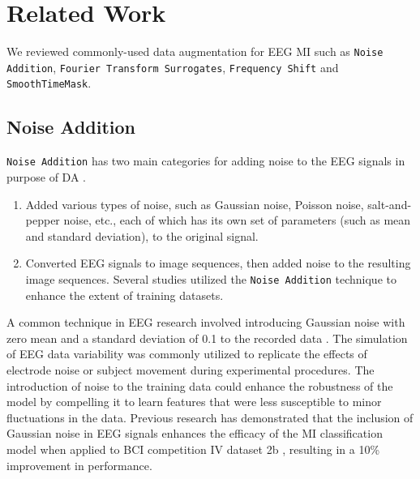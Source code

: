 \documentclass[runningheads]{llncs}
\begin{document}
\section{Related Work}

\begin{sloppypar}    
We reviewed commonly-used data augmentation for EEG MI such as \texttt{Noise Addition}, \texttt{Fourier Transform Surrogates}, \texttt{Frequency Shift} and \texttt{SmoothTimeMask}.
\end{sloppypar}

\subsection{Noise Addition}
\texttt{Noise Addition} has two main categories for adding noise to the EEG signals in purpose of DA \cite{lashgari2020data}.
\begin{enumerate}
  \item Added various types of noise, such as Gaussian noise, Poisson noise, salt-and-pepper noise, etc., each of which has its own set of parameters (such as mean and standard deviation), to the original signal.
  \item Converted EEG signals to image sequences, then added noise to the resulting image sequences. Several studies utilized the \texttt{Noise Addition} technique to enhance the extent of training datasets.

\end{enumerate}
A common technique in EEG research involved introducing Gaussian noise with zero mean and a standard deviation of 0.1 to the recorded data \cite{parvan2019transfer}.  The simulation of EEG data variability was commonly utilized to replicate the effects of electrode noise or subject movement during experimental procedures. The introduction of noise to the training data could enhance the robustness of the model by compelling it to learn features that were less susceptible to minor fluctuations in the data. Previous research has demonstrated that the inclusion of Gaussian noise in EEG signals enhances the efficacy of the MI classification model when applied to BCI competition IV dataset 2b \cite{leeb2008bci}, resulting in a 10\% improvement in performance.
\end{document}
